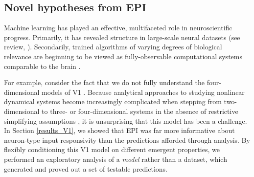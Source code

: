 \documentclass[11pt]{article}
\begin{document}
\subsection{Novel hypotheses from EPI} 
Machine learning has played an effective, multifaceted role in neuroscientific progress. 
Primarily, it has revealed structure in large-scale neural datasets \cite{kass2001spike, brown1998statistical, paninski2004maximum, byron2009gaussian, latimer2015single, duncker2019learning} (see review, \cite{paninski2018neural}).  
Secondarily, trained algorithms of varying degrees of biological relevance are beginning to be viewed as fully-observable computational systems comparable to the brain \cite{ sussillo2013opening, richards2019deep}.  

For example, consider the fact that we do not fully understand the four-dimensional models of V1 \cite{litwin2016inhibitory}.  
Because analytical approaches to studying nonlinear dynamical systems become increasingly complicated when stepping from two-dimensional to three- or four-dimensional systems in the absence of restrictive simplifying assumptions \cite{strogatz1994nonlinear}, it is unsurprising that this model has been a challenge. 
In Section \ref{results_V1}, we showed that EPI was far more informative about neuron-type input responsivity than the predictions afforded through analysis.
By flexibly conditioning this V1 model on different emergent properties, we performed an exploratory analysis of a \emph{model} rather than a dataset, which generated and proved out a set of testable predictions. 
\end{document}
